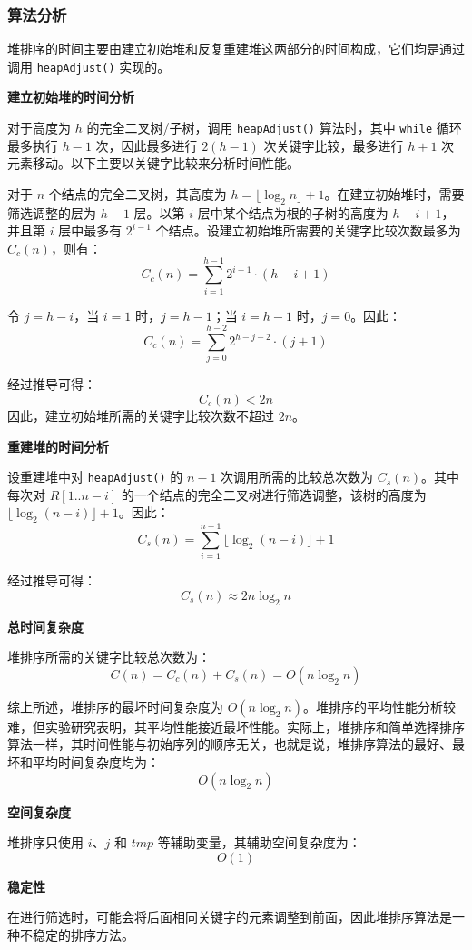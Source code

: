 \documentclass[lang=cn,newtx,10pt,scheme=chinese]{../elegantbook}
\begin{document}
\subsubsection{算法分析}

堆排序的时间主要由建立初始堆和反复重建堆这两部分的时间构成，它们均是通过调用 \texttt{heapAdjust()} 实现的。


\textbf{建立初始堆的时间分析} 

对于高度为 $h$ 的完全二叉树/子树，调用 \texttt{heapAdjust()} 算法时，其中 \texttt{while} 循环最多执行 $h - 1$ 次，因此最多进行 $2(h - 1)$ 次关键字比较，最多进行 $h + 1$ 次元素移动。以下主要以关键字比较来分析时间性能。

对于 $n$ 个结点的完全二叉树，其高度为 $h = \lfloor \log_2 n \rfloor + 1$。在建立初始堆时，需要筛选调整的层为 $h - 1$ 层。以第 $i$ 层中某个结点为根的子树的高度为 $h - i + 1$，并且第 $i$ 层中最多有 $2^{i-1}$ 个结点。设建立初始堆所需要的关键字比较次数最多为 $C_c(n)$，则有：
\[
C_c(n) = \sum_{i=1}^{h-1} 2^{i-1} \cdot (h - i + 1)
\]

令 $j = h - i$，当 $i = 1$ 时，$j = h - 1$；当 $i = h - 1$ 时，$j = 0$。因此：
\[
C_c(n) = \sum_{j=0}^{h-2} 2^{h-j-2} \cdot (j + 1)
\]

经过推导可得：
\[
C_c(n) < 2n
\]
因此，建立初始堆所需的关键字比较次数不超过 $2n$。


\textbf{重建堆的时间分析} 

设重建堆中对 \texttt{heapAdjust()} 的 $n-1$ 次调用所需的比较总次数为 $C_s(n)$。其中每次对 $R[1..n-i]$ 的一个结点的完全二叉树进行筛选调整，该树的高度为 $\lfloor \log_2 (n-i) \rfloor + 1$。因此：
\[
C_s(n) = \sum_{i=1}^{n-1} \lfloor \log_2 (n-i) \rfloor + 1
\]

经过推导可得：
\[
C_s(n) \approx 2n \log_2 n
\]


\textbf{总时间复杂度} 

堆排序所需的关键字比较总次数为：
\[
C(n) = C_c(n) + C_s(n) = O(n \log_2 n)
\]

综上所述，堆排序的最坏时间复杂度为 $O(n \log_2 n)$。堆排序的平均性能分析较难，但实验研究表明，其平均性能接近最坏性能。实际上，堆排序和简单选择排序算法一样，其时间性能与初始序列的顺序无关，也就是说，堆排序算法的最好、最坏和平均时间复杂度均为：
\[
O(n \log_2 n)
\]


\textbf{空间复杂度}  

堆排序只使用 $i$、$j$ 和 $tmp$ 等辅助变量，其辅助空间复杂度为：
\[
O(1)
\]


\textbf{稳定性}  

在进行筛选时，可能会将后面相同关键字的元素调整到前面，因此堆排序算法是一种不稳定的排序方法。
\end{document}
